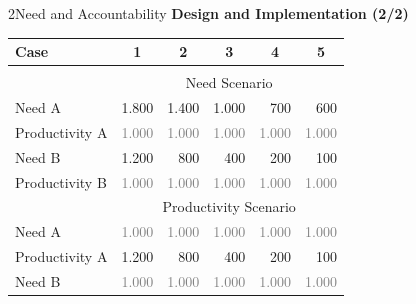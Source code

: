 \documentclass[xcolor=table,9pt,aspectratio=169]{beamer}
\begin{document}
\begin{frame}{\vspace*{10mm}2\hspace*{1em}Need and Accountability}
\textbf{Design and Implementation (2/2)}\\
\medskip
\begin{center}
   \begin{tabular}{lrrrrr}
      \arrayrulecolor{blue2}
      \hline
      Case                      & \multicolumn{1}{c}{1}     & \multicolumn{1}{c}{2}     & \multicolumn{1}{c}{3}     & \multicolumn{1}{c}{4}     & \multicolumn{1}{c}{5}     \\
      \hline\hline\\[-0.5em]
                                & \multicolumn{5}{c}{Need Scenario}                                                                                                         \\[0.5em]
      Need A                    &                  1.800    &                  1.400    &                  1.000    &                    700    &                    600    \\
      Productivity A            & \textcolor{gray}{1.000}   & \textcolor{gray}{1.000}   & \textcolor{gray}{1.000}   & \textcolor{gray}{1.000}   & \textcolor{gray}{1.000}   \\[0.5em]
      Need B                    &                  1.200    &                    800    &                    400    &                    200    &                    100    \\
      Productivity B            & \textcolor{gray}{1.000}   & \textcolor{gray}{1.000}   & \textcolor{gray}{1.000}   & \textcolor{gray}{1.000}   & \textcolor{gray}{1.000}   \\
      \hline
                                & \multicolumn{5}{c}{Productivity Scenario}                                                                                                 \\[0.5em]
      Need A                    & \textcolor{gray}{1.000}   & \textcolor{gray}{1.000}   & \textcolor{gray}{1.000}   & \textcolor{gray}{1.000}   & \textcolor{gray}{1.000}   \\
      Productivity A            &                  1.200    &                    800    &                    400    &                    200    &                    100    \\[0.5em]
      Need B                    & \textcolor{gray}{1.000}   & \textcolor{gray}{1.000}   & \textcolor{gray}{1.000}   & \textcolor{gray}{1.000}   & \textcolor{gray}{1.000}   \\

\end{tabular}
\end{center}
\end{frame}
\end{document}
